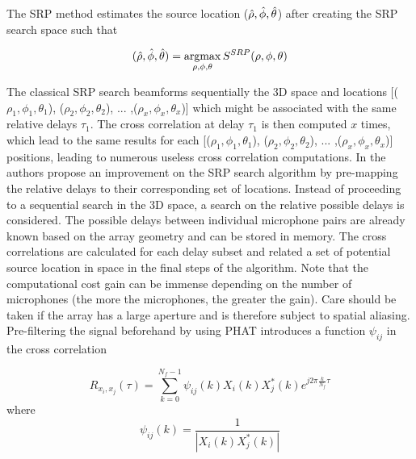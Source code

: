 The SRP method estimates the source location ($\Hat{\rho},\hat{\phi},\hat{\theta}$) after creating the SRP search space such that

\begin{equation}
    (\Hat{\rho},\hat{\phi},\hat{\theta})=\argmax_{\rho,\phi,\theta}S^{SRP}(\rho,\phi,\theta)
\end{equation}


The classical SRP search beamforms sequentially the 3D space and locations [($\rho_{1},\phi_{1},\theta_{1}$), ($\rho_{2},\phi_{2},\theta_{2}$), ... ,($\rho_{x},\phi_{x},\theta_{x}$)] which might be associated with the same relative delays $\tau_{1}$. The cross correlation at delay $\tau_{1}$ is then computed $x$ times, which lead to the same results for each [($\rho_{1},\phi_{1},\theta_{1}$), ($\rho_{2},\phi_{2},\theta_{2}$), ... ,($\rho_{x},\phi_{x},\theta_{x}$)] positions, leading to numerous useless cross correlation computations. In \cite{dmochowski2007generalized} the authors propose an improvement on the SRP search algorithm by pre-mapping the relative delays to their corresponding set of locations. Instead of proceeding to a sequential search in the 3D space, a search on the relative possible delays is considered. The possible delays between individual microphone pairs are already known based on the array geometry and can be stored in memory. The cross correlations are calculated for each delay subset and related a set of potential source location in space in the final steps of the algorithm. Note that the computational cost gain can be immense depending on the number of microphones (the more the microphones, the greater the gain). Care should be taken if the array has a large aperture and is therefore subject to spatial aliasing. Pre-filtering the signal beforehand by using PHAT introduces a function $\psi_{ij}$ in the cross correlation

\begin{equation}
    R_{x_i,x_j}(\tau)= \sum\limits_{k=0}^{N_{f}-1}{\psi_{ij}(k) X_{i}(k)X_{j}^*(k)e^{j2\pi\frac{k}{N_{f}}\tau}}
\end{equation}
where
\begin{equation}
    \psi_{ij}(k) = \frac{1}{|{X_{i}(k)X_{j}^*(k)}|}
\end{equation}


